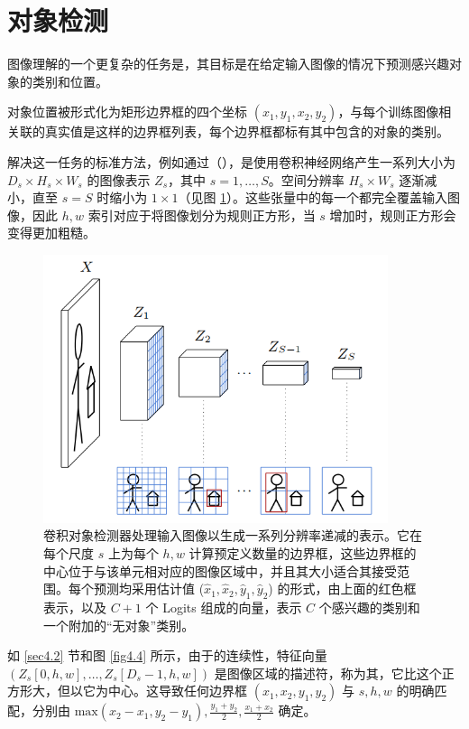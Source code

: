 \section{对象检测}\label{sec6.3}

图像理解的一个更复杂的任务是，其目标是在给定输入图像的情况下预测感兴趣对象的类别和位置。

对象位置被形式化为矩形边界框的四个坐标 $(x_1,y_1,x_2,y_2)$，与每个训练图像相关联的真实值是这样的边界框列表，每个边界框都标有其中包含的对象的类别。

解决这一任务的标准方法，例如通过（）\citep{arxiv-1512.02325}，是使用卷积神经网络产生一系列大小为 $D_s \times H_s \times W_s$ 的图像表示 $Z_s$，其中 $s = 1, \dots, S$。空间分辨率 $H_s \times W_s$ 逐渐减小，直至 $s = S$ 时缩小为 $1 \times 1$（见图 \ref{fig6.1}）。这些张量中的每一个都完全覆盖输入图像，因此 $h,w$ 索引对应于将图像划分为规则正方形，当 $s$ 增加时，规则正方形会变得更加粗糙。

\begin{figure}
    \centering
    \includegraphics[width=0.9\textwidth]{fig/fig6.1.png}
    \caption[卷积物体检测器]{卷积对象检测器处理输入图像以生成一系列分辨率递减的表示。它在每个尺度 $s$ 上为每个 $h,w$ 计算预定义数量的边界框，这些边界框的中心位于与该单元相对应的图像区域中，并且其大小适合其接受范围。每个预测均采用估计值 ($\hat{x}_1, \hat{x}_2, \hat{y}_1, \hat{y}_2$) 的形式，由上面的红色框表示，以及 $C + 1$ 个 Logits 组成的向量，表示 $C$ 个感兴趣的类别和一个附加的``无对象''类别。}
    \label{fig6.1}
\end{figure}

如 \ref{sec4.2} 节和图 \ref{fig4.4} 所示，由于的连续性，特征向量 $(Z_s[0,h,w],\dots,Z_s[D_s-1,h,w])$ 是图像区域的描述符，称为其，它比这个正方形大，但以它为中心。这导致任何边界框 $(x_1,x_2,y_1,y_2)$ 与 $s,h,w$ 的明确匹配，分别由 $\text{max}(x_2-x_1,y_2-y_1), \frac{y_1+y_2}{2}, \frac{x_1+x_2}{2}$ 确定。

